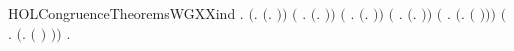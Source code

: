 \begin{SaveVerbatim}{HOLCongruenceTheoremsWGXXind}
\HOLTokenTurnstile{} \HOLSymConst{\HOLTokenForall{}}.
       \ensuremath{(}\HOLSymConst{\HOLTokenForall{}}.  \ensuremath{(}\HOLTokenLambda{}. \ensuremath{)}\ensuremath{)} \HOLSymConst{\HOLTokenConj{}} \ensuremath{(}\HOLSymConst{\HOLTokenForall{}} .   \HOLSymConst{\HOLTokenImp{}}  \ensuremath{(}\HOLTokenLambda{}. \HOLSymConst{\ensuremath{\ldotp}} \ensuremath{)}\ensuremath{)} \HOLSymConst{\HOLTokenConj{}}
       \ensuremath{(}\HOLSymConst{\HOLTokenForall{}} .   \HOLSymConst{\HOLTokenConj{}}   \HOLSymConst{\HOLTokenImp{}}  \ensuremath{(}\HOLTokenLambda{}.   \HOLSymConst{\ensuremath{+}}  \ensuremath{)}\ensuremath{)} \HOLSymConst{\HOLTokenConj{}}
       \ensuremath{(}\HOLSymConst{\HOLTokenForall{}} .   \HOLSymConst{\HOLTokenConj{}}   \HOLSymConst{\HOLTokenImp{}}  \ensuremath{(}\HOLTokenLambda{}.   \HOLSymConst{\ensuremath{\mid}}  \ensuremath{)}\ensuremath{)} \HOLSymConst{\HOLTokenConj{}}
       \ensuremath{(}\HOLSymConst{\HOLTokenForall{}} .   \HOLSymConst{\HOLTokenImp{}}  \ensuremath{(}\HOLTokenLambda{}.   \ensuremath{(} \ensuremath{)}\ensuremath{)}\ensuremath{)} \HOLSymConst{\HOLTokenConj{}}
       \ensuremath{(}\HOLSymConst{\HOLTokenForall{}} .   \HOLSymConst{\HOLTokenImp{}}  \ensuremath{(}\HOLTokenLambda{}.  \ensuremath{(} \ensuremath{)} \ensuremath{)}\ensuremath{)} \HOLSymConst{\HOLTokenImp{}}
       \HOLSymConst{\HOLTokenForall{}}.   \HOLSymConst{\HOLTokenImp{}}  
\end{SaveVerbatim}
